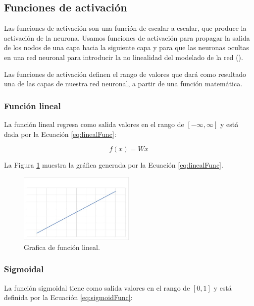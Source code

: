 \subsection{Funciones de activación}

Las funciones de activación son una función de escalar a escalar, que produce la activación de la neurona. Usamos funciones de activación para propagar la salida de los nodos de una capa hacia la siguiente capa y para que las neuronas ocultas en una red neuronal para introducir la no linealidad del modelado de la red (\cite{patterson2017deep}).


Las funciones de activación definen el rango de valores que dará como resultado una de las capas de nuestra red neuronal, a partir de una función matemática.

\subsubsection{Función lineal}

La función lineal regresa como salida valores en el rango de $[-\infty,\infty]$ y está dada por la Ecuación \ref{eq:linealFunc}:

\begin{equation}
\label{eq:linealFunc}
    f(x) = Wx
\end{equation}

La Figura \ref{fig:graficaLineal} muestra la gráfica generada por la Ecuación \ref{eq:linealFunc}.

\begin{figure}[H]
    \centering
    \includegraphics[width=0.5\textwidth]{MarcoTeorico/imgs/GraficaLineal.jpg}
    \caption{Grafica de función lineal.}
    \label{fig:graficaLineal}
\end{figure}

\subsubsection{Sigmoidal}

La función sigmoidal tiene como salida valores en el rango de $[0,1]$ y está definida por la Ecuación \ref{eq:sigmoidFunc}:


